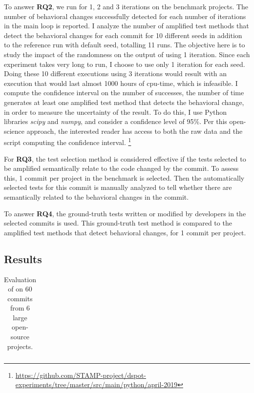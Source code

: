 To answer \textbf{RQ2}, we run \DCII for 1, 2 and 3 iterations on the benchmark projects.
The number of behavioral changes successfully detected for each number of iterations in the main loop is reported.
I analyze the number of amplified test methods that detect the behavioral changes for each commit for 10 different seeds in addition to the reference run with default seed, totalling 11 runs.
The objective here is to study the impact of the randomness on the output of \DCII using 1 iteration.
Since each experiment takes very long to run, I choose to use only 1 iteration for each seed.
Doing these 10 different executions using 3 iterations would result with an execution that would last almost 1000 hours of cpu-time, which is infeasible.
I compute the confidence interval on the number of successes, \ie the number of time \DCI generates at least one amplified test method that detects the behavioral change, in order to measure the uncertainty of the result.
To do this, I use Python libraries \emph{scipy} and \emph{numpy}, and consider a confidence level of 95\%. 
Per this open-science approach, the interested reader has access to both the raw data and the script computing the confidence interval. \footnote{\url{https://github.com/STAMP-project/dspot-experiments/tree/master/src/main/python/april-2019}}

For \textbf{RQ3}, the test selection method is considered effective if the tests selected to be amplified semantically relate to the code changed by the commit. 
To assess this, 1 commit per project in the benchmark is selected.
Then the automatically selected tests for this commit is manually analyzed to tell whether there are semantically related to the behavioral changes in the commit. 

To answer \textbf{RQ4}, the ground-truth tests written or modified by developers in the selected commits is used.
This ground-truth test method is compared to the amplified test methods that detect behavioral changes, for 1 commit per project.

\subsection{Results}
\label{subsec:result}
\begin{table}
\centering
\small
\def\arraystretch{0.1}%
\setlength\tabcolsep{.3pt} %
\caption{Evaluation of \DCI on 60 commits from 6 large open-source projects.}
\label{tab:overall_result}
\begin{tabular}{l|c|rcccc|c|cc|cc|cc|cc}
\toprule

\end{tabular}
\end{table}

